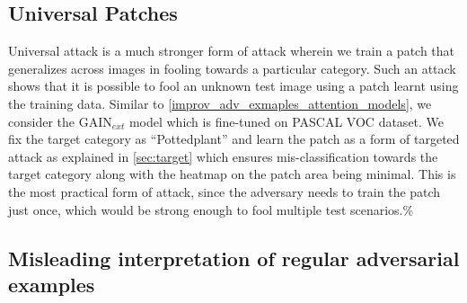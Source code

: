 \documentclass[10pt,twocolumn,letterpaper]{article}
\DeclareMathOperator*{\argmin}{arg\,min}
\begin{document}
\subsection{Universal Patches}
\label{universal_attention}
Universal attack is a much stronger form of attack wherein we train a patch that generalizes across images in fooling towards a particular category. Such an attack shows that it is possible to fool an unknown test image using a patch learnt using the training data. Similar to \ref{improv_adv_exmaples_attention_models}, we consider the GAIN$_{ext}$ model which is fine-tuned on PASCAL VOC dataset. We fix the target category as ``Pottedplant'' and learn the patch as a form of targeted attack as explained in \ref{sec:target} which ensures mis-classification towards the target category along with the heatmap on the patch area being minimal. This is the most practical form of attack, since the adversary needs to train the patch just once, which would be strong enough to fool multiple test scenarios.\%\subsection{Misleading interpretation of regular adversarial examples}


\end{document}
